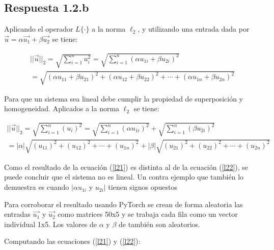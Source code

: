 \documentclass[12 pt]{article}
\begin{document}
\begin{enumerate}
\subsection{Respuesta 1.2.b}

Aplicando el operador ${L\{ \cdot \}}$ a la norma ${\ell_{2}}$, y utilizando una entrada dada por ${\vec{u}=\alpha \vec{u_{1}} + \beta \vec{u_{2}}}$ se tiene:

\begin{center}
\begin{equation} \label{l21}
\begin{split}
 ||\vec{u}||_{2} = \sqrt{\sum_{i=1}^{n} u_{i}^{2}} = \sqrt{\sum_{i=1}^{n} (\alpha u_{1i} + \beta u_{2i})^{2}} \\
 = \sqrt{(\alpha u_{11} + \beta u_{21})^{2} + (\alpha u_{12} + \beta u_{22})^{2} + \cdots + (\alpha u_{1n} + \beta u_{2n})^{2}}
\end{split}
\end{equation}
\end{center}

Para que un sistema sea lineal debe cumplir la propiedad de superposición y homogeneidad. Aplicados a la norma ${\ell_{2}}$ se tiene:

\begin{center}
\begin{equation} \label{l22}
\begin{split}
 ||\vec{u}||_{2} = \sqrt{\sum_{i=1}^{n} (u_{i})^{2}} = \sqrt{\sum_{i=1}^{n} (\alpha u_{1i})^{2}} + \sqrt{\sum_{i=1}^{n} (\beta u_{2i})^{2}} \\
 = |\alpha| \sqrt{(u_{11})^{2} + (u_{12})^{2} + \cdots + (u_{1n})^{2}} + |\beta| \sqrt{(u_{21})^{2} + (u_{22})^{2} + \cdots + (u_{2n})^{2}}
\end{split}
\end{equation}
\end{center}

Como el resultado de la ecuación (\ref{l21}) es distinta al de la ecuación (\ref{l22}), se puede concluir que el sistema no es lineal. Un contra ejemplo que también lo demuestra es cuando ${|\alpha u_{1i}}$ y ${u_{2i}|}$ tienen signos opuestos

Para corroborar el resultado usando PyTorch se crean de forma aleatoria las entradas ${\vec{u_{1}}}$ y ${\vec{u_{2}}}$ como matrices 50x5 y se trabaja cada fila como un vector individual 1x5. Los valores de ${\alpha}$ y ${\beta}$ de también son aleatorios.

Computando las ecuaciones (\ref{l21}) y (\ref{l22}):


\end{enumerate}
\end{document}
